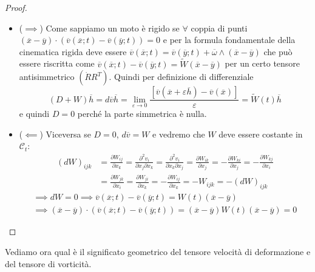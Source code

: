 \documentclass{book}
\theoremstyle{plain}
\theoremstyle{plain}
\theoremstyle{plain}
\theoremstyle{plain}
\theoremstyle{plain}
\theoremstyle{definition}
\theoremstyle{remark}
\theoremstyle{definition}
\begin{document}
\begin{proof}

    \noindent
    \begin{itemize}
        \item ($\implies$) Come sappiamo un moto è rigido se $\forall$ coppia di punti $(\overline{x}-\overline{y})\cdot(\overline{v}(\overline{x};t)-\overline{v}(\overline{y};t))=0$ e per la formula fondamentale della cinematica rigida deve essere $\overline{v}(\overline{x};t)=\overline{v}(\overline{y};t)+\overline{\omega}\wedge(\overline{x}-\overline{y})$ che può essere riscritta come $\overline{v}(\overline{x};t)-\overline{v}(\overline{y};t)=\widetilde{W}(\overline{x}-\overline{y})$ per un certo tensore antisimmetrico $(\Dot{R}R^T)$. Quindi per definizione di differenziale
    \begin{displaymath}
        (D+W)\overline{h}=d\overline{v}\overline{h}=\lim_{\varepsilon\to0}\frac{[\overline{v}(\overline{x}+\varepsilon\overline{h})-\overline{v}(\overline{x})]}{\varepsilon}=\widetilde{W}(t)\overline{h}
    \end{displaymath}
    e quindi $D=0$ perché la parte simmetrica è nulla.
    \item ($\impliedby$) Viceversa se $D=0$, $d\overline{v}=W$ e vedremo che $W$ deve essere costante in $\mathcal{C}_t$:
    \[
    \begin{split}
        (dW)_{ijk}&=\frac{\partial W_{ij}}{\partial x_k}=\frac{\partial^2v_i}{\partial x_j\partial x_k}=\frac{\partial^2v_i}{\partial x_k\partial x_j}=\frac{\partial W_{ik}}{\partial x_j}=-\frac{\partial W_{ki}}{\partial x_j}=-\frac{\partial W_{kj}}{\partial x_i} \\
        &=\frac{\partial W_{jk}}{\partial x_i}=\frac{\partial W_{ji}}{\partial x_k}=-\frac{\partial W_{ij}}{\partial x_k}=-W_{ijk}=-(dW)_{ijk}
    \end{split}
    \]
    \begin{gather*}
        \implies dW=0\implies\overline{v}(\overline{x};t)-\overline{v}(\overline{y};t)=W(t)(\overline{x}-\overline{y}) \\
        \implies(\overline{x}-\overline{y})\cdot(\overline{v}(\overline{x};t)-\overline{v}(\overline{y};t))=(\overline{x}-\overline{y})W(t)(\overline{x}-\overline{y})=0
    \end{gather*}
    \end{itemize}
    
\end{proof}

\noindent Vediamo ora qual è il significato geometrico del tensore velocità di deformazione e del tensore di vorticità.
\end{document}
